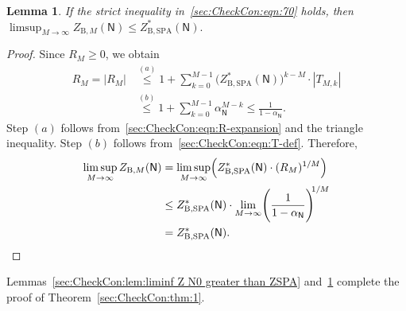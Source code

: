\documentclass[journal]{IEEEtran}
\newcommand{\add}[1]{{\color{black}#1}}
\newtheorem{lemma}[theorem]{Lemma}
\newcommand{\graphN}{ \mathsf{N} }
\newcommand{\ZBSPA}{ Z_{\mathrm{B,SPA}} }
\newcommand{\ZBM}{ Z_{\mathrm{B},M} }
\begin{document}
\begin{appendices}
  \begin{lemma}\label{sec:CheckCon:lem:limsup Z N0 smaller than ZSPA}
    If the strict inequality in~\eqref{sec:CheckCon:eqn:70} holds, then
    $
      \limsup_{M \to \infty}
      \ZBM(\graphN)
      \leq \ZBSPA^{*}(\graphN).
    $
  \end{lemma}
  \begin{proof}
    \add{Since $R_M\geq0$, we obtain
      \begin{align*}
        R_M
        = |R_M|
         & \overset{(a)}{\leq}
        1
        +
        \sum_{k=0}^{M-1} \bigl( \ZBSPA^{*}( \graphN) \bigr)^{\! k-M} \cdot |T_{M,k}| \\
         & \overset{(b)}{\leq}
        1 + \sum_{k=0}^{M-1}\alpha_{\graphN}^{M-k}
        \leq \frac{1}{1-\alpha_{\graphN}}.
      \end{align*}
      Step $(a)$ follows from~\eqref{sec:CheckCon:eqn:R-expansion} and the
      triangle inequality. Step $(b)$ follows
      from~\eqref{sec:CheckCon:eqn:T-def}.} Therefore,
    \begin{align*}
      \limsup_{M \to \infty}\ZBM(\graphN)
       & =
      \limsup_{M \to \infty}
      \Bigl( \ZBSPA^{*}(\graphN)
      \cdot (R_M)^{1/M} \Bigr)
      \\& \leq \ZBSPA^{*}(\graphN)
      \cdot \lim_{M\to\infty}
      \Biggl(  \frac{1}{1-\alpha_{\graphN}} \Biggr)^{\!\!1/M}
      \\&=\ZBSPA^{*}(\graphN).\qedhere
    \end{align*}
  \end{proof}

  Lemmas~\ref{sec:CheckCon:lem:liminf Z N0 greater than ZSPA} and~\ref{sec:CheckCon:lem:limsup Z N0 smaller than ZSPA} complete the proof of Theorem~\ref{sec:CheckCon:thm:1}.


\end{appendices}
\end{document}
